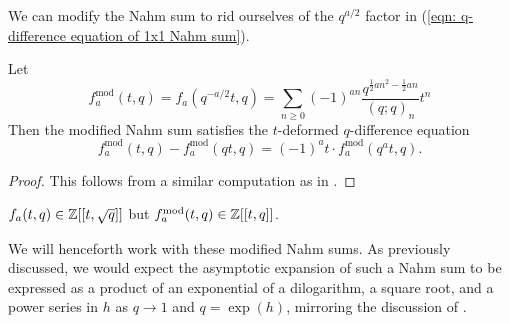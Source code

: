 We can modify the Nahm sum to rid ourselves of the $q^{a/2}$ factor in (\ref{eqn: q-difference equation of 1x1 Nahm sum}).
\begin{corollary}\label{corr: q-difference equation of modified 1x1 Nahm sum}
    Let 
    $$f_{a}^{\mathrm{mod}}(t,q)=f_{a}(q^{-a/2}t,q)=\sum_{n\geq0}(-1)^{an}\frac{q^{\frac{1}{2}an^{2}-\frac{1}{2}an}}{(q;q)_{n}}t^{n}$$
    Then the modified Nahm sum satisfies the $t$-deformed $q$-difference equation 
    \begin{equation}\label{eqn: q-difference equation}
        f_{a}^{\mathrm{mod}}(t,q) - f_{a}^{\mathrm{mod}}(qt,q) = (-1)^{a}t\cdot f_{a}^{\mathrm{mod}}(q^{a}t,q).
    \end{equation}
\end{corollary}
\begin{proof}
    This follows from a similar computation as in . 
\end{proof}
\begin{remark}
    $f_{a}(t,q)\in\mathbb{Z}[[t,\sqrt{q}]]$ but $f_{a}^{\mathrm{mod}}(t,q)\in\mathbb{Z}[[t,q]]$. 
\end{remark}
We will henceforth work with these modified Nahm sums. As previously discussed, we would expect the asymptotic expansion of such a Nahm sum to be expressed as a product of an exponential of a dilogarithm, a square root, and a power series in $h$ as $q\to 1$ and $q=\exp(h)$, mirroring the discussion of . 


